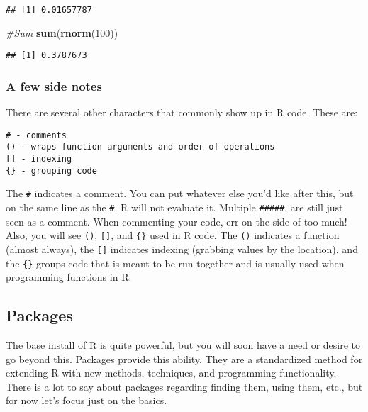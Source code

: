 \documentclass[]{article}
\newenvironment{Shaded}{\begin{snugshade}}{\end{snugshade}}
\newcommand{\CommentTok}[1]{\textcolor[rgb]{0.56,0.35,0.01}{\textit{#1}}}
\newcommand{\DecValTok}[1]{\textcolor[rgb]{0.00,0.00,0.81}{#1}}
\newcommand{\KeywordTok}[1]{\textcolor[rgb]{0.13,0.29,0.53}{\textbf{#1}}}
\newcommand{\NormalTok}[1]{#1}
\begin{document}
\begin{verbatim}
## [1] 0.01657787
\end{verbatim}

\begin{Shaded}
\begin{Highlighting}[]
\CommentTok{#Sum}
\KeywordTok{sum}\NormalTok{(}\KeywordTok{rnorm}\NormalTok{(}\DecValTok{100}\NormalTok{))}
\end{Highlighting}
\end{Shaded}

\begin{verbatim}
## [1] 0.3787673
\end{verbatim}

\hypertarget{a-few-side-notes}{%
\subsubsection{A few side notes}\label{a-few-side-notes}}

There are several other characters that commonly show up in R code.
These are:

\begin{verbatim}
# - comments
() - wraps function arguments and order of operations
[] - indexing
{} - grouping code
\end{verbatim}

The \texttt{\#} indicates a comment. You can put whatever else you'd
like after this, but on the same line as the \texttt{\#}. R will not
evaluate it. Multiple \texttt{\#\#\#\#\#}, are still just seen as a
comment. When commenting your code, err on the side of too much! Also,
you will see \texttt{()}, \texttt{{[}{]}}, and \texttt{\{\}} used in R
code. The \texttt{()} indicates a function (almost always), the
\texttt{{[}{]}} indicates indexing (grabbing values by the location),
and the \texttt{\{\}} groups code that is meant to be run together and
is usually used when programming functions in R.

\hypertarget{packages}{%
\subsection{Packages}\label{packages}}

The base install of R is quite powerful, but you will soon have a need
or desire to go beyond this. Packages provide this ability. They are a
standardized method for extending R with new methods, techniques, and
programming functionality. There is a lot to say about packages
regarding finding them, using them, etc., but for now let's focus just
on the basics.
\end{document}
